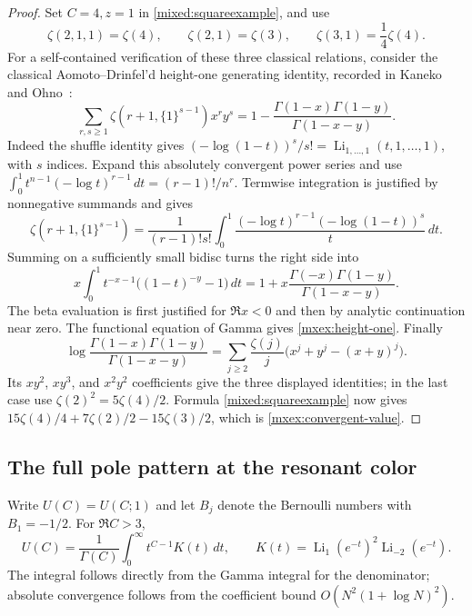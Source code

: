 \documentclass[11pt]{article}
\numberwithin{equation}{section}
\theoremstyle{plain}
\theoremstyle{definition}
\theoremstyle{remark}
\begin{document}
\begin{proof}
Set $C=4,z=1$ in \eqref{mixed:squareexample}, and use
\[
 \zeta(2,1,1)=\zeta(4),\qquad
 \zeta(2,1)=\zeta(3),\qquad
 \zeta(3,1)=\frac14\zeta(4).
\]
For a self-contained verification of these three classical relations,
consider the classical Aomoto--Drinfel'd height-one generating identity,
recorded in Kaneko and Ohno~\cite[Eq.~(5)]{mxex:KanekoOhno2010}:
\begin{equation}\label{mxex:height-one}
 \sum_{r,s\geq1}\zeta(r+1,\{1\}^{s-1})x^ry^s
   =1-\frac{\Gamma(1-x)\Gamma(1-y)}{\Gamma(1-x-y)}.
\end{equation}
Indeed the shuffle identity gives
$(-\log(1-t))^s/s!=\operatorname{Li}_{1,\ldots,1}(t,1,\ldots,1)$,
with $s$ indices.  Expand this absolutely convergent power series and
use
$\int_0^1t^{n-1}(-\log t)^{r-1}\,dt=(r-1)!/n^r$.
Termwise integration is justified by nonnegative summands and gives
\[
 \zeta(r+1,\{1\}^{s-1})
 =\frac1{(r-1)!s!}\int_0^1
   \frac{(-\log t)^{r-1}(-\log(1-t))^s}{t}\,dt.
\]
Summing on a sufficiently small bidisc turns the right side into
\[
 x\int_0^1t^{-x-1}\bigl((1-t)^{-y}-1\bigr)\,dt
 =1+x\frac{\Gamma(-x)\Gamma(1-y)}{\Gamma(1-x-y)}.
\]
The beta evaluation is first justified for $\Re x<0$ and then by
analytic continuation near zero.  The functional equation of Gamma
gives \eqref{mxex:height-one}.  Finally
\[
 \log\frac{\Gamma(1-x)\Gamma(1-y)}{\Gamma(1-x-y)}
 =\sum_{j\geq2}\frac{\zeta(j)}j
   \bigl(x^j+y^j-(x+y)^j\bigr).
\]
Its $xy^2$, $xy^3$, and $x^2y^2$ coefficients give the three displayed
identities; in the last case use $\zeta(2)^2=5\zeta(4)/2$.
Formula \eqref{mixed:squareexample} now gives
$15\zeta(4)/4+7\zeta(2)/2-15\zeta(3)/2$, which is
\eqref{mxex:convergent-value}.
\end{proof}

\subsection{The full pole pattern at the resonant color}

Write $U(C)=U(C;1)$ and let $B_j$ denote the Bernoulli numbers with
$B_1=-1/2$.  For $\Re C>3$,
\begin{equation}\label{mxex:mellin}
 U(C)=\frac1{\Gamma(C)}\int_0^\infty t^{C-1}K(t)\,dt,
 \qquad
 K(t)=\operatorname{Li}_1(e^{-t})^2
                  \operatorname{Li}_{-2}(e^{-t}).
\end{equation}
The integral follows directly from the Gamma integral for the denominator;
absolute convergence follows from the coefficient bound $O(N^2(1+\log N)^2)$.
\end{document}

